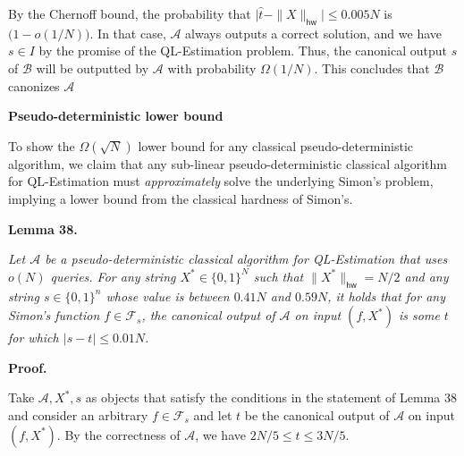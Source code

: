 By the Chernoff bound, the probability that $\big|\hat{t}-\|X\|_{\mathsf{hw}}\big|\leq 0.005N$ is $\big(1-o(1/N)\big)$. In that case, $\mathcal{A}$ always outputs a correct solution, and we have $s\in I$ by the promise of the QL-Estimation problem.
Thus, the canonical output $s$ of $\mathcal{B}$ will be outputted by $\mathcal{A}$ with probability $\Omega(1/N)$. This concludes that $\mathcal{B}$ canonizes $\mathcal{A}$\par





\par\medskip\noindent\textbf{Pseudo-deterministic lower bound}\par




To show the $\Omega(\sqrt{N})$ lower bound for any classical pseudo-deterministic algorithm, we claim that any sub-linear pseudo-deterministic classical algorithm for QL-Estimation must \emph{approximately} solve the underlying Simon’s problem, implying a lower bound from the classical hardness of Simon’s.\par





\par\medskip\noindent\textbf{
\textbf{Lemma 38}\textbf{.}
}\par



\emph{Let $\mathcal{A}$ be a pseudo-deterministic classical algorithm for QL-Estimation that uses $o(N)$ queries. For any string $X^{*}\in\{0,1\}^{N}$ such that $\|X^{*}\|_{\mathsf{hw}}=N/2$ and any string $s\in\{0,1\}^{n}$ whose value is between $0.41N$ and $0.59N$, it holds that for any Simon’s function $f\in\mathcal{F}_{s}$, the canonical output of $\mathcal{A}$ on input $(f,X^{*})$ is some $t$ for which $|s-t|\leq 0.01N$.}\par






\par\medskip\noindent\textbf{Proof.}\par




Take $\mathcal{A},X^{*},s$ as objects that satisfy the conditions in the statement of Lemma 38 and consider an arbitrary $f\in\mathcal{F}_{s}$ and let $t$ be the canonical output of $\mathcal{A}$ on input $(f,X^{*})$. By the correctness of $\mathcal{A}$, we have $2N/5\leq t\leq 3N/5$.\par




